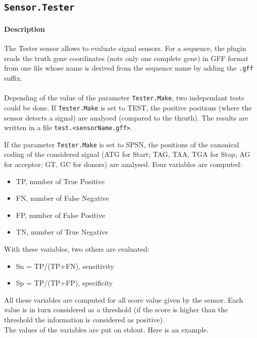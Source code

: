 
\subsection{\texttt{Sensor.Tester}}

\paragraph{Description}

The Tester sensor allows to evaluate signal sensors. For a sequence,
the plugin reads the truth gene coordinates (note only one complete gene) in GFF format from one file whose name
is derived from the sequence name by adding the \texttt{.gff} suffix.\\
\\
Depending of the value of the parameter \texttt{Tester.Make}, two independant tests could be done. If \texttt{Tester.Make} is set to TEST, the positive positions (where the sensor detects a signal) are analysed (compared to the thruth). The results are written in a file \texttt{test.<sensorName.gff>}. 

If the parameter \texttt{Tester.Make} is set to SPSN, the positions of the canonical coding of the considered signal (ATG for Start; TAG, TAA, TGA for Stop; AG for acceptor; GT, GC for donors) are analysed. Four variables are computed:
\begin{itemize} 
\item TP, number of True Positive
\item FN, number of False Negative
\item FP, number of False Positive
\item TN, number of True Negative
\end {itemize}
With these variables, two others are evaluated:
\begin {itemize}
\item Sn = TP/(TP+FN), sensitivity
\item Sp = TP/(TP+FP), specificity
\end {itemize}

All these variables are computed for all score value given by the sensor. Each value is in turn considered as a threshold (if the score is higher than the threshold the information is considered as positive).\\
The values of the variables are put on stdout. Here is an example.

